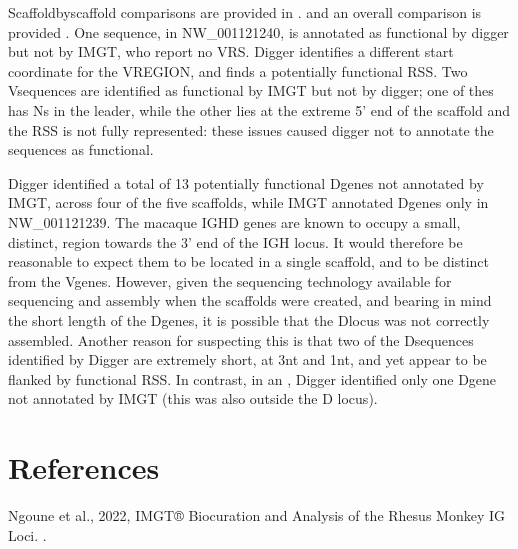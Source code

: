 \documentclass[letterpaper,10pt,english]{sphinxmanual}
\begin{document}
\sphinxAtStartPar
Scaffold\sphinxhyphen{}by\sphinxhyphen{}scaffold comparisons are provided in .
and an overall comparison is provided .
One sequence, in NW\_001121240, is annotated as functional by digger but not by IMGT, who report no V\sphinxhyphen{}RS. Digger identifies a different start co\sphinxhyphen{}ordinate for the V\sphinxhyphen{}REGION,
and finds a potentially functional RSS. Two V\sphinxhyphen{}sequences are identified as functional by IMGT but not by digger; one of thes has Ns in the leader, while the other
lies at the extreme 5’ end of the scaffold and the RSS is not fully represented: these issues caused digger not to annotate the sequences as functional.

\sphinxAtStartPar
Digger identified a total of 13 potentially functional D\sphinxhyphen{}genes not annotated by IMGT, across four of the five scaffolds, while IMGT annotated D\sphinxhyphen{}genes only in NW\_001121239. The macaque IGHD genes are known
to occupy a small, distinct, region towards the 3’ end of the IGH locus. It would therefore be reasonable to expect them to be located in a single scaffold, and to be
distinct from the V\sphinxhyphen{}genes. However, given the sequencing technology available for sequencing and assembly when the scaffolds were created, and bearing
in mind the short length of the D\sphinxhyphen{}genes, it is possible that the D\sphinxhyphen{}locus was not correctly assembled. Another reason for suspecting this is that two of the D\sphinxhyphen{}sequences
identified by Digger are extremely short, at 3nt and 1nt, and yet appear to be flanked by functional RSS. In contrast, in an
, Digger identified only one D\sphinxhyphen{}gene
not annotated by IMGT (this was also outside the D locus).


\section{References}
\label{\detokenize{examples/rhesus_igh:references}}
\sphinxAtStartPar
Ngoune et al., 2022, IMGT® Biocuration and Analysis of the Rhesus Monkey IG Loci.  .
\end{document}
